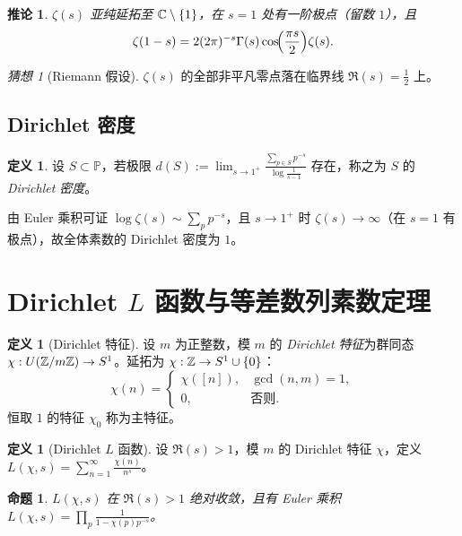 \documentclass{article}
\newcommand{\Prim}{\mathbb{P}}
\theoremstyle{plain}
\newtheorem{cor}[thm]{推论}
\newtheorem{prop}[thm]{命题}
\theoremstyle{definition}
\newtheorem{defn}[thm]{定义}
\theoremstyle{remark}
\newtheorem{conj}[thm]{猜想}
\begin{document}
\begin{cor}\label{cor:zeta-func-eq}
  $\zeta(s)$ 亚纯延拓至 $\mathbb{C}\setminus\{1\}$，在 $s=1$ 处有一阶极点（留数 $1$），且
  \[
    \zeta(1-s)=2(2\pi)^{-s}\Gamma(s)\cos\!\Bigl(\frac{\pi s}{2}\Bigr)\zeta(s).
  \]
\end{cor}

\begin{conj}[Riemann 假设]
  $\zeta(s)$ 的全部非平凡零点落在临界线 $\Re(s)=\tfrac12$ 上。
\end{conj}

\subsection{Dirichlet 密度}

\begin{defn}
  设 $S\subset\Prim$，若极限 $\displaystyle d(S):=\lim_{s\to1^+}\frac{\sum_{p\in S}p^{-s}}{\log\frac1{s-1}}$ 存在，称之为 $S$ 的\emph{Dirichlet 密度}。
\end{defn}

由 Euler 乘积可证 $\log\zeta(s)\sim\sum_p p^{-s}$，且 $s\to1^+$ 时 $\zeta(s)\to\infty$（在 $s=1$ 有极点），故全体素数的 Dirichlet 密度为 $1$。

\section{Dirichlet $L$ 函数与等差数列素数定理}

\begin{defn}[Dirichlet 特征]
  设 $m$ 为正整数，模 $m$ 的 \emph{Dirichlet 特征}为群同态 $\chi:U(\mathbb{Z}/m\mathbb{Z})\to S^1$。延拓为 $\chi:\mathbb{Z}\to S^1\cup\{0\}$：
  \[
    \chi(n)=
    \begin{cases}\chi([n]),&\gcd(n,m)=1,\\0,&\text{否则}.
    \end{cases}
  \]
  恒取 $1$ 的特征 $\chi_0$ 称为主特征。
\end{defn}

\begin{defn}[Dirichlet $L$ 函数]
  设 $\Re(s)>1$，模 $m$ 的 Dirichlet 特征 $\chi$，定义 $\displaystyle L(\chi,s)=\sum_{n=1}^\infty\frac{\chi(n)}{n^s}$。
\end{defn}

\begin{prop}\label{prop:L-euler}
  $L(\chi,s)$ 在 $\Re(s)>1$ 绝对收敛，且有 Euler 乘积 $L(\chi,s)=\displaystyle\prod_{p}\frac1{1-\chi(p)p^{-s}}$。
\end{prop}
\end{document}
